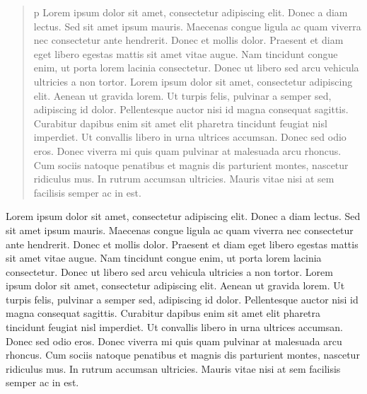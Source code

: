 \documentclass{article}
\begin{document}
\begin{quote}p
Lorem ipsum dolor sit amet, consectetur adipiscing elit. Donec a diam lectus. Sed sit amet ipsum mauris. Maecenas congue ligula ac quam viverra nec consectetur ante hendrerit. Donec et mollis dolor. Praesent et diam eget libero egestas mattis sit amet vitae augue. Nam tincidunt congue enim, ut porta lorem lacinia consectetur. Donec ut libero sed arcu vehicula ultricies a non tortor. Lorem ipsum dolor sit amet, consectetur adipiscing elit. Aenean ut gravida lorem. Ut turpis felis, pulvinar a semper sed, adipiscing id dolor. Pellentesque auctor nisi id magna consequat sagittis. Curabitur dapibus enim sit amet elit pharetra tincidunt feugiat nisl imperdiet. Ut convallis libero in urna ultrices accumsan. Donec sed odio eros. Donec viverra mi quis quam pulvinar at malesuada arcu rhoncus. Cum sociis natoque penatibus et magnis dis parturient montes, nascetur ridiculus mus. In rutrum accumsan ultricies. Mauris vitae nisi at sem facilisis semper ac in est.
\end{quote}

Lorem ipsum dolor sit amet, consectetur adipiscing elit. Donec a diam lectus. Sed sit amet ipsum mauris. Maecenas congue ligula ac quam viverra nec consectetur ante hendrerit. Donec et mollis dolor. Praesent et diam eget libero egestas mattis sit amet vitae augue. Nam tincidunt congue enim, ut porta lorem lacinia consectetur. Donec ut libero sed arcu vehicula ultricies a non tortor. Lorem ipsum dolor sit amet, consectetur adipiscing elit. Aenean ut gravida lorem. Ut turpis felis, pulvinar a semper sed, adipiscing id dolor. Pellentesque auctor nisi id magna consequat sagittis. Curabitur dapibus enim sit amet elit pharetra tincidunt feugiat nisl imperdiet. Ut convallis libero in urna ultrices accumsan. Donec sed odio eros. Donec viverra mi quis quam pulvinar at malesuada arcu rhoncus. Cum sociis natoque penatibus et magnis dis parturient montes, nascetur ridiculus mus. In rutrum accumsan ultricies. Mauris vitae nisi at sem facilisis semper ac in est.
\end{document}
